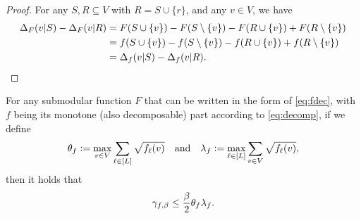 \begin{proof}
  For any $S, R \subseteq V$ with $R = S \cup \{r\}$, and any $v \in V$, we have
  \begin{align*}
    \Delta_F(v|S) - \Delta_F(v|R) &= F(S \cup \{v\}) - F(S \setminus \{v\}) - F(R \cup \{v\}) + F(R \setminus \{v\})\\
    &= f(S \cup \{v\}) - f(S \setminus \{v\}) - f(R \cup \{v\}) + f(R \setminus \{v\})\\
    &= \Delta_f(v|S) - \Delta_f(v|R).
  \end{align*}
\end{proof}

\begin{cor} \label{cor:fast_full}
  For any submodular function $F$ that can be written in the form of \eqref{eq:fdec}, with $f$ being its monotone (also decomposable) part according to \eqref{eq:decomp}, if we define
  \begin{align*}
    \theta_f \vcentcolon= \max_{v \in V} \sum_{\ell \in [L]} \sqrt{f_{\ell}(v)} \hspace{1em}\textrm{and}\hspace{1em} \lambda_f \vcentcolon= \max_{\ell \in [L]} \sum_{v \in V} \sqrt{f_{\ell}(v)},
  \end{align*}
  then it holds that
  \begin{align*}
    \gamma_{f,\beta} \leq \frac{\beta}{2} \theta_f \lambda_f.
  \end{align*}
\end{cor}

